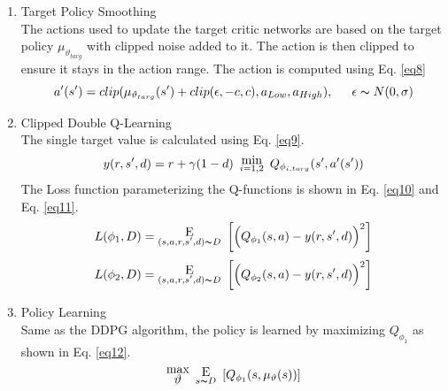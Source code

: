    \begin{enumerate}[label={\alph*)}]
        \item Target Policy Smoothing\\
        The actions used to update the target critic networks are based on the target policy $\mu_{\vartheta_{targ}}$ with clipped noise added to it. The action is then clipped to ensure it stays in the action range. The action is computed using Eq. \ref{eq8}
        \begin{equation}
            a'(s') = clip (\mu_{\vartheta_{targ}}(s') + clip (\epsilon, -c, c), a_{Low}, a_{High}), \hspace{15pt} \epsilon \thicksim N(0,\sigma)  
        \label{eq8}
    \end{equation}
    \item Clipped Double Q-Learning\\
    The single target value is calculated using Eq. \ref{eq9}.
    \begin{equation}
        y(r, s', d) = r + \gamma (1 - d) \hspace{5pt} \substack{\mathlarger{\text{min}} \\ i = 1,2} \hspace{5pt} Q_{\phi_{i,targ}}(s',a'(s')) 
        \label{eq9}
    \end{equation}
    The Loss function parameterizing the Q-functions is shown in Eq. \ref{eq10} and Eq. \ref{eq11}.
    \begin{equation}
        L(\phi_{1}, D) = \substack{ \mathlarger{\mathlarger{\text{E}}}  \\ (s,a,r,s',d) \thicksim D}\hspace{5pt} \bigg[\Big(Q_{\phi_{1}}(s, a) - y(r, s', d) \Big)^2 \bigg]
        \label{eq10}
    \end{equation}
    \begin{equation}
        L(\phi_{2}, D) = \substack{ \mathlarger{\mathlarger{\text{E}}}  \\ (s,a,r,s',d) \thicksim D}\hspace{5pt} \bigg[\Big(Q_{\phi_{2}}(s, a) - y(r, s', d) \Big)^2 \bigg]
        \label{eq11}
    \end{equation}
    \item Policy Learning\\
    Same as the DDPG algorithm, the policy is learned by maximizing $Q_{\phi_{1}}$ as shown in Eq. \ref{eq12}.
    \begin{equation}
        \substack{\mathlarger{\text{max}} \\ \mathlarger{\vartheta}} \hspace{5pt} \substack{\mathlarger{\text{E}} \\ s \thicksim D} \hspace{5pt} [Q_{\phi_{1}}(s, \mu_{\vartheta}(s))] 
        \label{eq12}
    \end{equation}
    \end{enumerate}
